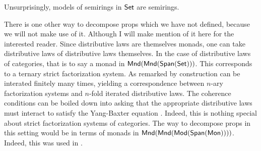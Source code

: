 Unsurprisingly, models of semirings in $\mathsf{Set}$ are semirings.


\begin{aside}
There is one other way to decompose props which we have not defined, because we will not make use of it.  Although I will make mention of it here for the interested reader. Since distributive laws are themselves monads, one can take distributive laws of distributive laws themselves. In the case of distributive laws of categories, that is to say a monad in ${\sf Mnd}({\sf Mnd}(\mathsf{Span}(\mathsf{Set})))$.  This corresponds to a ternary strict factorization system.  As remarked by \cite{????} construction can be interated finitely many times, yielding a correspondence between $n$-ary factorization systems and $n$-fold iterated distributive laws.  The coherence conditions can be boiled down into asking that the appropriate distributive laws must interact to satisfy the Yang-Baxter equation \cite{iterdist}. Indeed, this is nothing special about strict factorization systems of categories.  The way to decompose props in this setting would be in terms of monads in ${\sf Mnd}({\sf Mnd}({\sf Mod}(\mathsf{Span}({\sf Mon}))))$.  Indeed, this was used in \cite[????]{ih}.

\end{aside}

%
%
%
%


